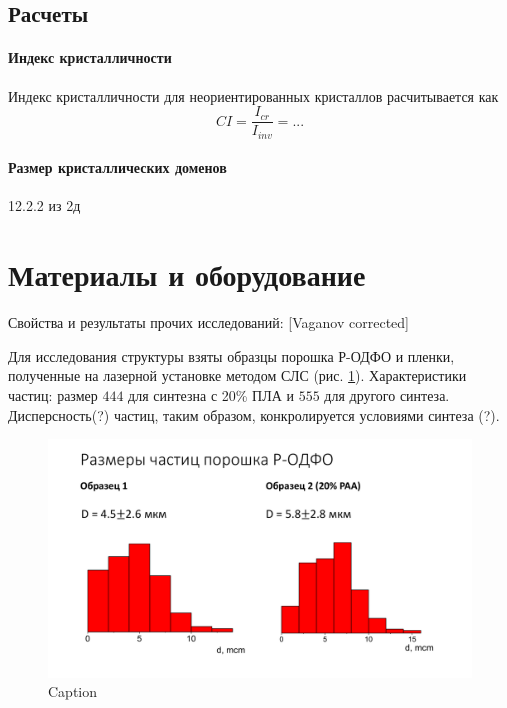 \subsection{Расчеты}



\paragraph{Индекс кристалличности}

Индекс кристалличности для неориентированных кристаллов расчитывается как
\begin{equation}
    CI = \frac{I_{cr}}{I_{inv} } = ...
    \end{equation}

\paragraph{Размер кристаллических доменов}

12.2.2 из 2д




\section{Материалы и оборудование}
	Свойства и результаты прочих исследований:
	[Vaganov corrected]


Для исследования структуры взяты образцы порошка Р-ОДФО и пленки, полученные на лазерной установке методом СЛС (рис. \ref{fig:particles}).
Характеристики частиц: размер $444$ для синтезна с 20\% ПЛА и $555$  для другого синтеза. Дисперсность(?) частиц, таким образом, конкролируется условиями синтеза (?).
	
	\begin{figure}[h]
	    \centering
	    \includegraphics[width=\linewidth]{fig/particles}
	    \caption{Caption}
	    \label{fig:particles}
	\end{figure}
	
